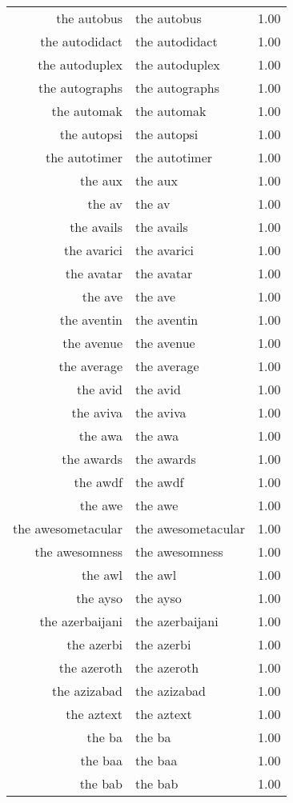 \begin{table}[ht]
\begin{tabular}{rlr}
  the autobus & the autobus & 1.00 \\ 
  the autodidact & the autodidact & 1.00 \\ 
  the autoduplex & the autoduplex & 1.00 \\ 
  the autographs & the autographs & 1.00 \\ 
  the automak & the automak & 1.00 \\ 
  the autopsi & the autopsi & 1.00 \\ 
  the autotimer & the autotimer & 1.00 \\ 
  the aux & the aux & 1.00 \\ 
  the av & the av & 1.00 \\ 
  the avails & the avails & 1.00 \\ 
  the avarici & the avarici & 1.00 \\ 
  the avatar & the avatar & 1.00 \\ 
  the ave & the ave & 1.00 \\ 
  the aventin & the aventin & 1.00 \\ 
  the avenue & the avenue & 1.00 \\ 
  the average & the average & 1.00 \\ 
  the avid & the avid & 1.00 \\ 
  the aviva & the aviva & 1.00 \\ 
  the awa & the awa & 1.00 \\ 
  the awards & the awards & 1.00 \\ 
  the awdf & the awdf & 1.00 \\ 
  the awe & the awe & 1.00 \\ 
  the awesometacular & the awesometacular & 1.00 \\ 
  the awesomness & the awesomness & 1.00 \\ 
  the awl & the awl & 1.00 \\ 
  the ayso & the ayso & 1.00 \\ 
  the azerbaijani & the azerbaijani & 1.00 \\ 
  the azerbi & the azerbi & 1.00 \\ 
  the azeroth & the azeroth & 1.00 \\ 
  the azizabad & the azizabad & 1.00 \\ 
  the aztext & the aztext & 1.00 \\ 
  the ba & the ba & 1.00 \\ 
  the baa & the baa & 1.00 \\ 
  the bab & the bab & 1.00 \\ 

\end{tabular}
\end{table}
